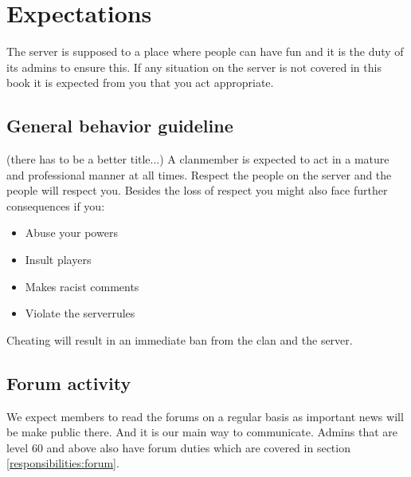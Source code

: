 \chapter{Expectations}
The server is supposed to a place where people can have fun and it is the duty of its admins to ensure this. If any situation on the server is not covered in this book it is expected from you that you act appropriate.

\section{General behavior guideline}
\label{expectations:general}
(there has to be a better title...)
A clanmember is expected to act in a mature and professional manner at all times. Respect the people on the server and the people will respect you. Besides the loss of respect you might also face further consequences if you:

\begin{itemize}
  \item Abuse your powers
  \item Insult players
  \item Makes racist comments
	\item Violate the serverrules
\end{itemize}

Cheating will result in an immediate ban from the clan and the server.

\section{Forum activity}
We expect members to read the forums on a regular basis as important news will be make public there. And it is our main way to communicate. Admins that are level 60 and above also have forum duties which are covered in section \ref{responsibilities:forum}.


